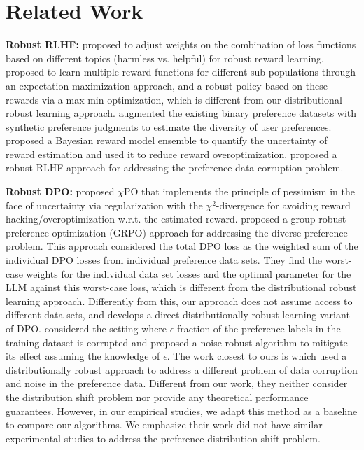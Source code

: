 \section{Related Work}
\textbf{Robust RLHF: } \citet{bai2022training} proposed to adjust weights on the combination of loss functions based on different topics (harmless vs. helpful) for robust reward learning. \citet{chakraborty2024maxmin} proposed to learn multiple reward functions for different sub-populations through an expectation-maximization approach,  and a robust policy based on these rewards via a max-min optimization, which is different from our distributional robust learning approach. \citet{padmakumar2024beyond} augmented the existing binary preference datasets with synthetic preference judgments to estimate the diversity of user preferences. \citet{yan2024reward} proposed a Bayesian reward model ensemble to quantify the uncertainty of reward estimation and used it to reduce reward overoptimization. \citet{bukharin2024robust} proposed a robust RLHF approach for addressing the preference data corruption problem. 

\textbf{Robust DPO: } \citet{huang2024correcting} proposed $\chi$PO that implements the principle of pessimism in the face of uncertainty via regularization with the $\chi^{2}$-divergence for avoiding reward hacking/overoptimization w.r.t. the estimated reward. \citet{ramesh2024group} proposed a group robust preference optimization (GRPO) approach for addressing the diverse preference problem. This approach considered the total DPO loss as the weighted sum of the individual DPO losses from individual preference data sets. They find the worst-case weights for the individual data set losses and the optimal parameter for the LLM against this worst-case loss, which is different from the distributional robust learning approach. Differently from this, our approach does not assume access to different data sets, and develops a direct distributionally robust learning variant of DPO. \citet{chowdhury2024provably} considered the setting where  $\epsilon$-fraction of the preference labels in the training dataset is corrupted and proposed a noise-robust algorithm to mitigate its effect assuming the  knowledge of $\epsilon$. The work closest to ours is \citet{wu2024towards} which used a distributionally robust approach to address a different problem of data corruption and noise in the preference data. Different from our work, they neither consider the distribution shift problem nor provide any theoretical performance guarantees. However, in our empirical studies, we adapt this method as a baseline to compare our algorithms. We emphasize their work did not have similar experimental studies to address the preference distribution shift problem. 

